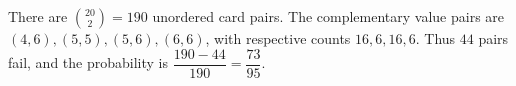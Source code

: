 There are $\binom{20}{2}=190$ unordered card pairs. The complementary value pairs are $(4,6),(5,5),(5,6),(6,6)$, with respective counts $16,6,16,6$. Thus $44$ pairs fail, and the probability is $\boxed{\dfrac{190-44}{190}=\dfrac{73}{95}}$.
